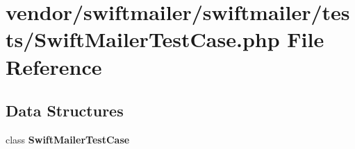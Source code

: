 \section{vendor/swiftmailer/swiftmailer/tests/\+Swift\+Mailer\+Test\+Case.php File Reference}
\label{_swift_mailer_test_case_8php}
\subsection*{Data Structures}
\begin{DoxyCompactItemize}
\item 
class {\bf Swift\+Mailer\+Test\+Case}
\end{DoxyCompactItemize}
